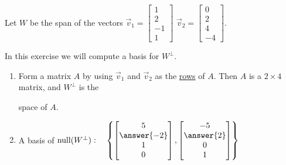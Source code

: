 \documentclass{ximera}
\author{}
\begin{document}
\begin{exercise}
Let $W$ be the span of the vectors $\vec{v}_1=\begin{bmatrix}1\\2\\-1\\1\end{bmatrix}$ $\vec{v}_2=\begin{bmatrix}0\\2\\4\\-4\end{bmatrix}$. 

In this exercise we will compute a basis for $W^\perp$.

\begin{enumerate}
    \item Form a matrix $A$ by using $\vec{v}_1$ and $\vec{v}_2$ as the \underline{rows} of $A$.  Then $A$ is a $2 \times 4$ matrix, and $W^\perp$ is the 
    \begin{multipleChoice}
    \end{multipleChoice} space of $A$.

    \item A basis of $\mbox{null}(W^\perp):\quad\left\{\begin{bmatrix}5\\\answer{-2}\\1\\0\end{bmatrix}, \begin{bmatrix}-5\\\answer{2}\\0\\1\end{bmatrix} \right\}$

\end{enumerate}

 \end{exercise}
 
\end{document}
